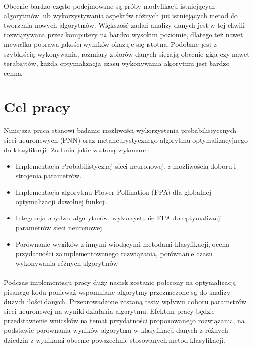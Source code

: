 \documentclass[a4paper,12pt,twoside]{article}
\begin{document}
	\paragraph{}
	Obecnie bardzo często podejmowane są próby modyfikacji istniejących algorytmów lub wykorzystywania aspektów różnych już istniejących metod do tworzenia nowych algorytmów. Większość zadań analizy danych jest w tej chwili rozwiązywana przez komputery na bardzo wysokim poziomie, dlatego też nawet niewielka poprawa jakości wyników okazuje się istotna. Podobnie jest z szybkością wykonywania, rozmiary zbiorów danych sięgają obecnie giga czy nawet terabajtów, każda optymalizacja czasu wykonywania algorytmu jest bardzo cenna.  
\paragraph{}

	 
	
\newpage
\thispagestyle{empty}
\mbox{}

\newpage
\section*{Cel pracy}
\paragraph{}
Niniejsza praca stanowi badanie możliwości wykorzystania probabilistycznych sieci neuronowych (PNN) oraz metaheurystycznego algorytmu optymalizacyjnego do klasyfikacji. Zadania jakie zostaną wykonane:
\begin{itemize}
\item Implementacja Probabilistycznej sieci neuronowej, z możliwością doboru i strojenia parametrów.
\item Implementacja algorytmu Flower Pollination (FPA) dla globalnej optymalizacji dowolnej funkcji.
\item Integracja obydwu algorytmów, wykorzystanie FPA do optymalizacji parametrów sieci neuronowej
\item Porównanie wyników z innymi wiodącymi metodami klasyfikacji, ocena przydatności zaimplementowanego rozwiązania, porównanie czasu wykonywania różnych algorytmów
\end{itemize}
\paragraph{}
Podczas implementacji pracy duży nacisk zostanie położony na optymalizację pisanego kodu ponieważ wspomniane algorytmy przeznaczone są do analizy dużych ilości danych. Przeprowadzone zostaną testy wpływu doboru parametrów sieci neuronowej na wyniki działania algorytmu. Efektem pracy będzie przedstawienie wniosków na temat przydatności proponowanego rozwiązania, na podstawie porównania wyników algorytmu w klasyfikacji danych z różnych dziedzin z wynikami obecnie powszechnie stosowanych metod klasyfikacji. 
\newpage
\thispagestyle{empty}
\mbox{}
\end{document}
